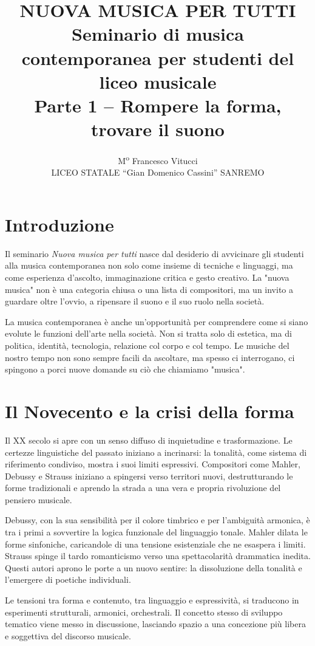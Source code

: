 \documentclass[12pt,a4paper]{article}
\title{\textbf{NUOVA MUSICA PER TUTTI} \\ \large Seminario di musica contemporanea per studenti del liceo musicale \\ \normalsize Parte 1 -- Rompere la forma, trovare il suono}
\author{M\textsuperscript{o} Francesco Vitucci \\ LICEO STATALE ``Gian Domenico Cassini'' SANREMO}
\date{}
\begin{document}
\maketitle

\tableofcontents

\section{Introduzione}
Il seminario \emph{Nuova musica per tutti} nasce dal desiderio di avvicinare gli studenti alla musica contemporanea non solo come insieme di tecniche e linguaggi, ma come esperienza d’ascolto, immaginazione critica e gesto creativo. La "nuova musica" non \`e una categoria chiusa o una lista di compositori, ma un invito a guardare oltre l’ovvio, a ripensare il suono e il suo ruolo nella societ\`a.

La musica contemporanea \`e anche un'opportunit\`a per comprendere come si siano evolute le funzioni dell’arte nella societ\`a. Non si tratta solo di estetica, ma di politica, identit\`a, tecnologia, relazione col corpo e col tempo. Le musiche del nostro tempo non sono sempre facili da ascoltare, ma spesso ci interrogano, ci spingono a porci nuove domande su ci\`o che chiamiamo "musica".

\section{Il Novecento e la crisi della forma}
Il XX secolo si apre con un senso diffuso di inquietudine e trasformazione. Le certezze linguistiche del passato iniziano a incrinarsi: la tonalit\`a, come sistema di riferimento condiviso, mostra i suoi limiti espressivi. Compositori come Mahler, Debussy e Strauss iniziano a spingersi verso territori nuovi, destrutturando le forme tradizionali e aprendo la strada a una vera e propria rivoluzione del pensiero musicale.

Debussy, con la sua sensibilit\`a per il colore timbrico e per l’ambiguit\`a armonica, \`e tra i primi a sovvertire la logica funzionale del linguaggio tonale. Mahler dilata le forme sinfoniche, caricandole di una tensione esistenziale che ne esaspera i limiti. Strauss spinge il tardo romanticismo verso una spettacolarit\`a drammatica inedita. Questi autori aprono le porte a un nuovo sentire: la dissoluzione della tonalit\`a e l'emergere di poetiche individuali.

Le tensioni tra forma e contenuto, tra linguaggio e espressivit\`a, si traducono in esperimenti strutturali, armonici, orchestrali. Il concetto stesso di sviluppo tematico viene messo in discussione, lasciando spazio a una concezione pi\`u libera e soggettiva del discorso musicale.
\end{document}
